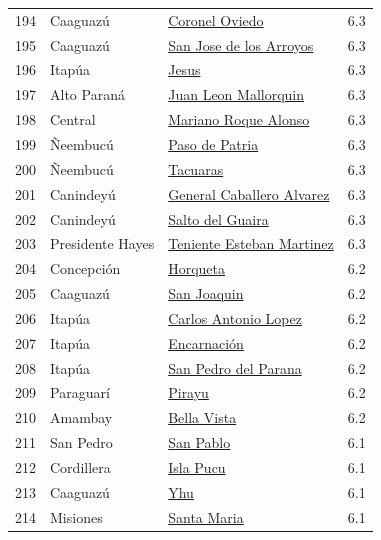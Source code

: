 {\begin{longtable}[]{@{}llll@{}}
194 & Caaguazú & \hyperref[dist:05_Caaguazu:Coronel_Oviedo]{Coronel Oviedo} & 6.3 \\
195 & Caaguazú & \hyperref[dist:05_Caaguazu:San_Jose_de_los_Arroyos]{San Jose de los Arroyos} & 6.3 \\
196 & Itapúa & \hyperref[dist:07_Itapua:Jesus]{Jesus} & 6.3 \\
197 & Alto Paraná & \hyperref[dist:10_Alto_Parana:Juan_Leon_Mallorquin]{Juan Leon Mallorquin} & 6.3 \\
198 & Central & \hyperref[dist:11_Central:Mariano_Roque_Alonso]{Mariano Roque Alonso} & 6.3 \\
199 & Ñeembucú & \hyperref[dist:12_Neembucu:Paso_de_Patria]{Paso de Patria} & 6.3 \\
200 & Ñeembucú & \hyperref[dist:12_Neembucu:Tacuaras]{Tacuaras} & 6.3 \\
201 & Canindeyú & \hyperref[dist:14_Canindeyu:General_Caballero_Alvarez]{General Caballero Alvarez} & 6.3 \\
202 & Canindeyú & \hyperref[dist:14_Canindeyu:Salto_del_Guaira]{Salto del Guaira} & 6.3 \\
203 & Presidente Hayes & \hyperref[dist:15_Presidente_Hayes:Teniente_Esteban_Martinez]{Teniente Esteban Martinez} & 6.3 \\
204 & Concepción & \hyperref[dist:01_Concepción:Horqueta]{Horqueta} & 6.2 \\
205 & Caaguazú & \hyperref[dist:05_Caaguazu:San_Joaquin]{San Joaquin} & 6.2 \\
206 & Itapúa & \hyperref[dist:07_Itapua:Carlos_Antonio_Lopez]{Carlos Antonio Lopez} & 6.2 \\
207 & Itapúa & \hyperref[dist:07_Itapua:Encarnación]{Encarnación} & 6.2 \\
208 & Itapúa & \hyperref[dist:07_Itapua:San_Pedro_del_Parana]{San Pedro del Parana} & 6.2 \\
209 & Paraguarí & \hyperref[dist:09_Paraguari:Pirayu]{Pirayu} & 6.2 \\
210 & Amambay & \hyperref[dist:13_Amambay:Bella_Vista]{Bella Vista} & 6.2 \\
211 & San Pedro & \hyperref[dist:02_San_Pedro:San_Pablo]{San Pablo} & 6.1 \\
212 & Cordillera & \hyperref[dist:03_Cordillera:Isla_Pucu]{Isla Pucu} & 6.1 \\
213 & Caaguazú & \hyperref[dist:05_Caaguazu:Yhu]{Yhu} & 6.1 \\
214 & Misiones & \hyperref[dist:08_Misiones:Santa_Maria]{Santa Maria} & 6.1 \\

\end{longtable}}
